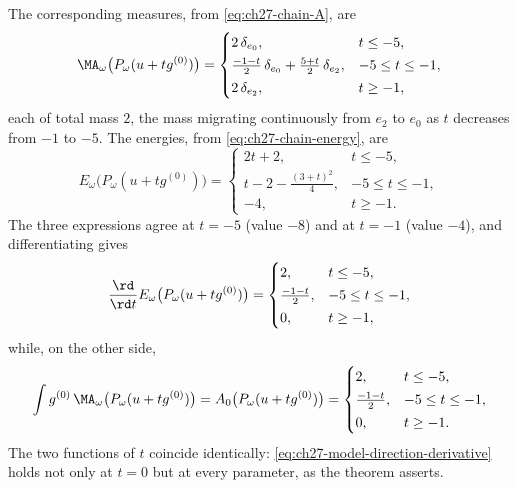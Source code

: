 \begin{example}
The corresponding measures, from \eqref{eq:ch27-chain-A}, are
\[
 \MA_\omega\bigl(P_\omega(u+tg^{(0)})\bigr)
 =\begin{cases}
   2\,\delta_{e_0}, & t\leq-5,\\[2pt]
   \tfrac{-1-t}2\,\delta_{e_0}+\tfrac{5+t}2\,\delta_{e_2},
     & -5\leq t\leq-1,\\[2pt]
   2\,\delta_{e_2}, & t\geq-1,
  \end{cases}
\]
each of total mass $2$, the mass migrating continuously from $e_2$ to
$e_0$ as $t$ decreases from $-1$ to $-5$.  The energies, from
\eqref{eq:ch27-chain-energy}, are
\[
 E_\omega\bigl(P_\omega(u+tg^{(0)})\bigr)
 =\begin{cases}
   2t+2, & t\leq-5,\\[2pt]
   t-2-\tfrac{(3+t)^2}4, & -5\leq t\leq-1,\\[2pt]
   -4, & t\geq-1 .
  \end{cases}
\]
The three expressions agree at $t=-5$ (value $-8$) and at $t=-1$
(value $-4$), and differentiating gives
\[
 \frac{\rd}{\rd t}
 E_\omega\bigl(P_\omega(u+tg^{(0)})\bigr)
 =\begin{cases}
   2, & t\leq-5,\\[2pt]
   \tfrac{-1-t}2, & -5\leq t\leq-1,\\[2pt]
   0, & t\geq-1,
  \end{cases}
\]
while, on the other side,
\[
 \int g^{(0)}\,\MA_\omega\bigl(P_\omega(u+tg^{(0)})\bigr)
 =A_0\bigl(P_\omega(u+tg^{(0)})\bigr)
 =\begin{cases}
   2,& t\leq-5,\\[2pt]
   \tfrac{-1-t}2,& -5\leq t\leq-1,\\[2pt]
   0,& t\geq-1 .
  \end{cases}
\]  The two functions of $t$
coincide identically:
\eqref{eq:ch27-model-direction-derivative} holds not only at $t=0$ but at
every parameter, as the theorem asserts.


\end{example}
